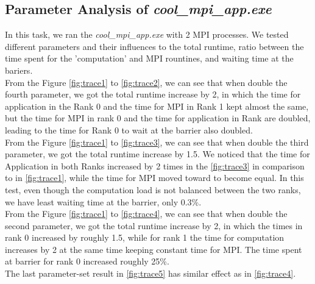 \documentclass[article]{scrartcl}
\begin{document}
\subsection{Parameter Analysis of \textit{cool\_mpi\_app.exe}}

In this task, we ran the \textit{cool\_mpi\_app.exe} with 2 MPI processes. We tested different parameters and their influences to the total runtime, ratio between the time spent for the 'computation' and MPI rountines, and waiting time at the bariers. \\
From the Figure \ref{fig:trace1} to \ref{fig:trace2}, we can see that when double the fourth parameter, we got the total runtime increase by 2, in which the time for application in the Rank 0 and the time for MPI in Rank 1 kept almost the same, but the time for MPI in rank 0 and the time for application in Rank are doubled, leading to the time for Rank 0 to wait at the barrier also doubled. \\
From the Figure \ref{fig:trace1} to \ref{fig:trace3}, we can see that when double the third parameter, we got the total runtime increase by 1.5. We noticed that the time for Application in both Ranks increased by 2 times in the \ref{fig:trace3} in comparison to in \ref{fig:trace1}, while the time for MPI moved toward to become equal. In this test, even though the computation load is not balanced between the two ranks, we have least waiting time at the barrier, only 0.3\%. \\
From the Figure \ref{fig:trace1} to \ref{fig:trace4}, we can see that when double the second parameter, we got the total runtime increase by 2, in which the times in rank 0 increased by roughly 1.5, while for rank 1 the time for computation increases by 2 at the same time keeping constant time for MPI. The time spent at barrier for rank 0 increased roughly 25\%. \\
The last parameter-set result in \ref{fig:trace5} has similar effect as in \ref{fig:trace4}.
\end{document}
